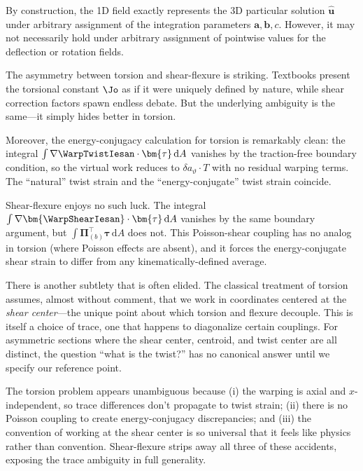 \begin{remark}
By construction, the 1D field exactly represents the 3D particular solution $\hat{\bm u}$ under arbitrary assignment of the integration parameters \(\bm{a},\bm{b},c\). 
However, it may not necessarily hold under arbitrary assignment of pointwise values for the deflection or rotation fields. 
\end{remark}
\begin{remark}
The asymmetry between torsion and shear-flexure is striking. 
Textbooks present the torsional constant $\Jo$ as if it were uniquely defined by nature, while 
shear correction factors spawn endless debate. 
But the underlying ambiguity is the same—it simply hides better in torsion.

Moreover, the energy-conjugacy calculation for torsion is remarkably clean: 
the integral $\int \nabla\WarpTwistIesan \cdot \bm{\tau} \, \mathrm{d}A$ vanishes by 
the traction-free boundary condition, so the virtual work reduces to 
$\delta a_\vartheta \cdot T$ with no residual warping terms. The ``natural'' 
twist strain and the ``energy-conjugate'' twist strain coincide.

Shear-flexure enjoys no such luck. 
The integral 
$\int \nabla\bm{\WarpShearIesan} \cdot \bm{\tau} \, \mathrm{d}A$ vanishes by the same 
boundary argument, but $\int \bm{\Pi}_{(b)}^\top \bm{\tau} \, \mathrm{d}A$ does not. 
This Poisson-shear coupling has no analog in torsion (where Poisson effects are absent), and it forces the energy-conjugate shear strain to differ from any kinematically-defined average.

There is another subtlety that is often elided. 
The classical treatment of 
torsion assumes, almost without comment, that we work in coordinates centered 
at the \emph{shear center}—the unique point about which torsion and flexure decouple. 
This is itself a choice of trace, one that happens to 
diagonalize certain couplings. 
For asymmetric sections where the shear center, 
centroid, and twist center are all distinct, the question ``what is the twist?'' has no canonical answer until we specify our reference point.

The torsion problem appears unambiguous because (i) the warping is axial and 
$x$-independent, so trace differences don't propagate to twist strain; (ii) 
there is no Poisson coupling to create energy-conjugacy discrepancies; and 
(iii) the convention of working at the shear center is so universal that it 
feels like physics rather than convention. 
Shear-flexure strips away all three 
of these accidents, exposing the trace ambiguity in full generality.
\end{remark}

